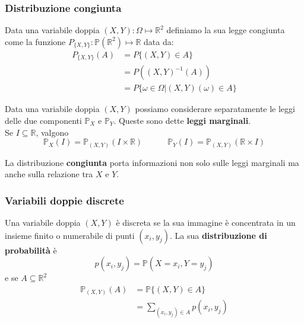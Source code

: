 \subsubsection{Distribuzione congiunta}
\begin{definition}
	Data una variabile doppia $(X,Y): \Omega \mapsto\mathbb{R}^2$ definiamo la sua legge congiunta come la funzione $P_{\{X,Y\}}: \mathbb{P}(\mathbb{R}^2)\mapsto\mathbb{R}$ data da:
	\begin{align*}
		P_{\{X,Y\}}(A)&  = P\{(X,Y) \in A\} \\
		&= P((X,Y)^{-1}(A)) \\
		& = P\{\omega \in \Omega \vert (X,Y)(\omega)\in A\}
	\end{align*} 
\end{definition}

\begin{definition}
	Data una variabile doppia $(X,Y)$ possiamo considerare separatamente le leggi delle due componenti $\mathbb{P}_X$ e $\mathbb{P}_Y$. Queste sono dette \textbf{leggi marginali}.\\
	Se $I \subseteq \mathbb{R}$, valgono
	\begin{equation}
		\mathbb{P}_X(I)=\mathbb{P}_{(X,Y)}(I \times \mathbb{R}) \quad\quad\quad \mathbb{P}_Y(I)=\mathbb{P}_{(X,Y)}(\mathbb{R}\times I)
	\end{equation}	
\end{definition}

\begin{note}
	La distribuzione \textbf{congiunta} porta informazioni non solo sulle leggi marginali ma anche sulla relazione tra $X$ e $Y$.
\end{note}

\subsubsection{Variabili doppie discrete}
Una variabile doppia $(X,Y)$ è discreta se la sua immagine è concentrata in un insieme finito o numerabile di punti $(x_i, y_j)$. La sua \textbf{distribuzione di probabilità} è
\begin{equation}
	p(x_i,y_j) = \mathbb{P}(X=x_i, Y=y_j)
\end{equation}
e se $A\subseteq \mathbb{R}^2$
\begin{align*}
	\mathbb{P}_{(X,Y)}(A) & = \mathbb{P}\{(X,Y) \in A\} \\
	& = \sum_{(x_i, y_j) \in A}p(x_i, y_j)
\end{align*}

